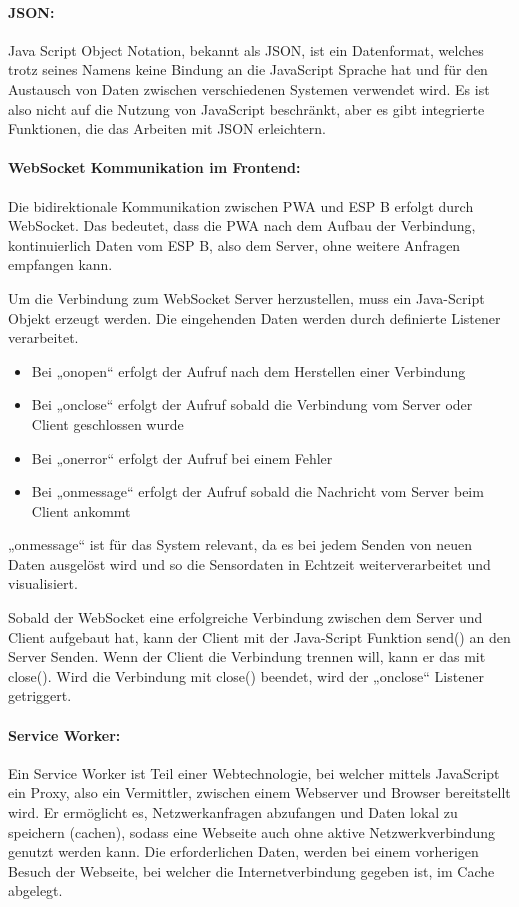 \paragraph{JSON:}
Java Script Object Notation, bekannt als JSON, ist ein Datenformat, welches trotz seines Namens keine Bindung an die JavaScript Sprache hat und für den Austausch von Daten zwischen verschiedenen Systemen verwendet wird. Es ist also nicht auf die Nutzung von JavaScript beschränkt, 
aber es gibt integrierte Funktionen, die das Arbeiten mit JSON erleichtern. \cite{opcRouter_json}

\paragraph{WebSocket Kommunikation im Frontend:}
Die bidirektionale Kommunikation zwischen PWA und ESP B erfolgt durch WebSocket. Das bedeutet, dass die PWA nach dem Aufbau der Verbindung, kontinuierlich Daten vom ESP B, also dem Server, ohne weitere Anfragen empfangen kann.

\noindent
Um die Verbindung zum WebSocket Server herzustellen, muss ein Java-Script Objekt erzeugt werden. Die eingehenden Daten werden durch definierte Listener verarbeitet.
\begin{itemize}
    \item Bei „onopen“ erfolgt der Aufruf nach dem Herstellen einer Verbindung
    \item Bei „onclose“ erfolgt der Aufruf sobald die Verbindung vom Server oder Client geschlossen wurde
    \item Bei „onerror“ erfolgt der Aufruf bei einem Fehler
    \item Bei „onmessage“ erfolgt der Aufruf sobald die Nachricht vom Server beim Client ankommt
\end{itemize}			
„onmessage“ ist für das System relevant, da es bei jedem Senden von neuen Daten ausgelöst wird und so die Sensordaten in Echtzeit weiterverarbeitet und visualisiert.

\noindent
Sobald der WebSocket eine erfolgreiche Verbindung zwischen dem Server und Client aufgebaut hat, kann der Client mit der Java-Script Funktion send() an den Server Senden. Wenn der Client die Verbindung trennen will, kann er das mit close(). 
Wird die Verbindung mit close() beendet, wird der „onclose“ Listener getriggert. \cite{heise_websocket}

\paragraph{Service Worker:}
Ein Service Worker ist Teil einer Webtechnologie, bei welcher mittels JavaScript ein Proxy, also ein Vermittler, zwischen einem Webserver und Browser bereitstellt wird. Er ermöglicht es, Netzwerkanfragen abzufangen und Daten lokal zu speichern (cachen), sodass eine Webseite auch ohne aktive Netzwerkverbindung genutzt werden kann. Die erforderlichen Daten, werden bei einem vorherigen Besuch der Webseite, bei welcher die Internetverbindung gegeben ist, im Cache abgelegt.

